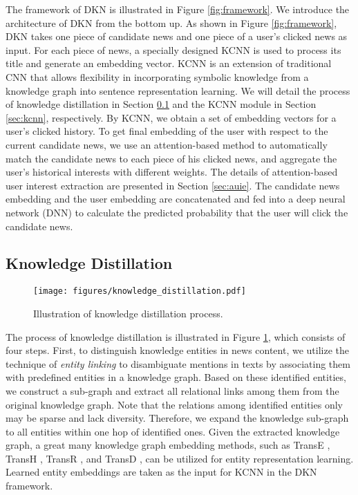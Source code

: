 \documentclass[sigconf]{acmart}
\begin{document}
		The framework of DKN is illustrated in Figure \ref{fig:framework}.
		We introduce the architecture of DKN from the bottom up.
		As shown in Figure \ref{fig:framework}, DKN takes one piece of candidate news and one piece of a user's clicked news as input.
		For each piece of news, a specially designed KCNN is used to process its title and generate an embedding vector.
		KCNN is an extension of traditional CNN that allows flexibility in incorporating symbolic knowledge from a knowledge graph into sentence representation learning.
		We will detail the process of knowledge distillation in Section \ref{sec:kd} and the KCNN module in Section \ref{sec:kcnn}, respectively.
		By KCNN, we obtain a set of embedding vectors for a user's clicked history.
		To get final embedding of the user with respect to the current candidate news, we use an attention-based method to automatically match the candidate news to each piece of his clicked news, and aggregate the user's historical interests with different weights.
		The details of attention-based user interest extraction are presented in Section \ref{sec:auie}.
		The candidate news embedding and the user embedding are concatenated and fed into a deep neural network (DNN) to calculate the predicted probability that the user will click the candidate news.
	
	
	\subsection{Knowledge Distillation}
	\label{sec:kd}
		\begin{figure}[t]
			\centering
  			\texttt{[image: figures/knowledge\_distillation.pdf]}
  			\caption{Illustration of knowledge distillation process.}
  			\label{fig:knowledge_distillation}
		\end{figure}
		
		The process of knowledge distillation is illustrated in Figure \ref{fig:knowledge_distillation}, which consists of four steps.
		First, to distinguish knowledge entities in news content, we utilize the technique of \textit{entity linking} \cite{milne2008learning, sil2013re} to disambiguate mentions in texts by associating them with predefined entities in a knowledge graph.
		Based on these identified entities, we construct a sub-graph and extract all relational links among them from the original knowledge graph.
		Note that the relations among identified entities only may be sparse and lack diversity.
		Therefore, we expand the knowledge sub-graph to all entities within one hop of identified ones.
		Given the extracted knowledge graph, a great many knowledge graph embedding methods, such as TransE \cite{bordes2013translating}, TransH \cite{wang2014knowledge}, TransR \cite{lin2015learning}, and TransD \cite{ji2015knowledge}, can be utilized for entity representation learning.
		Learned entity embeddings are taken as the input for KCNN in the DKN framework.
		
\end{document}
